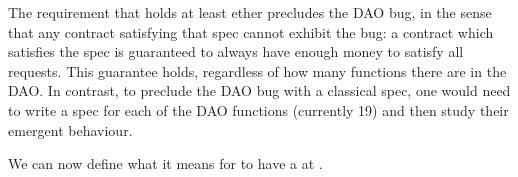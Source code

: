 \vspace{.1cm}


\vspace{.1cm}

\noindent
The requirement that  holds at least  ether precludes the DAO bug,
in the sense that  any contract satisfying that spec cannot exhibit  the  bug:   a contract
which satisfies the spec  is guaranteed to always have enough money to satisfy all  requests.
This guarantee  holds, regardless of how many functions there are in the DAO.
In contrast, to preclude the DAO  bug with a classical spec, one would need to write a spec for each of the
DAO functions (currently 19) and then study their emergent  behaviour.


\vspace{.005cm}

We can now define  what it means for  to have a   at  . 